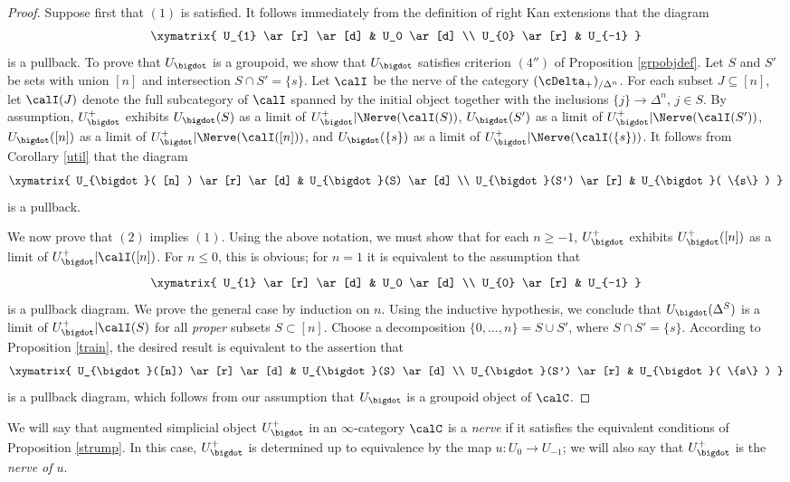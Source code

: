 \begin{proof}
Suppose first that $(1)$ is satisfied. It follows immediately from the definition of right Kan extensions that the diagram $$ \xymatrix{ U_{1} \ar[r] \ar[d] & U_0 \ar[d] \\
U_{0} \ar[r] & U_{-1} }$$ 
is a pullback. To prove that $U_{\bigdot}$ is a groupoid, we show that $U_{\bigdot}$ satisfies criterion $(4'')$ of Proposition \ref{grpobjdef}. Let $S$ and $S'$ be sets with union $[n]$ and intersection $S \cap S' = \{s\}$. Let $\calI$ be the nerve of the category
$(\cDelta_{+})_{/\Delta^n}$. For each subset $J \subseteq [n]$, let 
$\calI(J)$ denote the full subcategory of $\calI$ spanned by the initial object
together with the inclusions $\{j\} \rightarrow \Delta^n$, $j \in S$. By assumption,
$U_{\bigdot}^{+}$ exhibits $U_{\bigdot}(S)$ as a limit of
$U_{\bigdot}^{+} | \Nerve(\calI(S))$, $U_{\bigdot}(S')$ as a limit of
$U_{\bigdot}^{+} | \Nerve(\calI(S'))$, $U_{\bigdot}([n])$ as a limit of
$U_{\bigdot}^{+} | \Nerve(\calI( [n] ))$, and $U_{\bigdot}( \{s\} )$ as a limit of
$U_{\bigdot}^{+} | \Nerve(\calI(\{s\}))$. It follows from Corollary \ref{util}
that the diagram
$$ \xymatrix{ U_{\bigdot}( [n] ) \ar[r] \ar[d] & U_{\bigdot}(S) \ar[d] \\
U_{\bigdot}(S') \ar[r] & U_{\bigdot}( \{s\} ) }$$
is a pullback.

We now prove that $(2)$ implies $(1)$. Using the above notation, we must show that for each
$n \geq -1$, $U_{\bigdot}^{+}$ exhibits $U_{\bigdot}^{+}([n])$ as a limit of
$U_{\bigdot}^{+} | \calI( [n] )$. For $n \leq 0$, this is obvious; for $n=1$ it is equivalent to the assumption that
$$ \xymatrix{ U_{1} \ar[r] \ar[d] & U_0 \ar[d] \\
U_{0} \ar[r] & U_{-1} }$$ is a pullback diagram. We prove the general case by induction on $n$.
Using the inductive hypothesis, we conclude that $U_{\bigdot}(\Delta^{S})$ is a limit of
$U_{\bigdot}^{+} | \calI(S)$ for all {\em proper} subsets $S \subset [n]$. Choose
a decomposition $\{0, \ldots, n\} = S \cup S'$, where $S \cap S' = \{s\}$. According to
Proposition \ref{train}, the desired result is equivalent to the assertion that
$$ \xymatrix{ U_{\bigdot}([n]) \ar[r] \ar[d] & U_{\bigdot}(S) \ar[d] \\
U_{\bigdot}(S') \ar[r] & U_{\bigdot}( \{s\} ) }$$
is a pullback diagram, which follows from our assumption that $U_{\bigdot}$ is a groupoid object of $\calC$.
\end{proof}

We will say that augmented simplicial object $U_{\bigdot}^{+}$ in an $\infty$-category $\calC$ is a {\it \Cech nerve} if it satisfies the equivalent conditions of Proposition \ref{strump}. In this case, $U_{\bigdot}^{+}$ is determined up to equivalence by the map $u: U_0 \rightarrow U_{-1}$; we will also say that $U_{\bigdot}^{+}$ is the {\it \Cech nerve of $u$}. 

